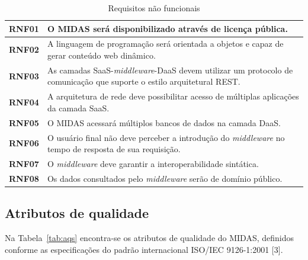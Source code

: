 \documentclass[11pt,a4paper]{article}
\begin{document}
\begin{table}[htb]
\centering
\caption{Requisitos não funcionais} \label{tab:rnf}
\begin{tabular*}{\linewidth}{@{\extracolsep{\fill}}|r p{13cm}|} \hline
\textbf{RNF01} & O MIDAS será disponibilizado através de licença pública. \\ \hline
\textbf{RNF02} & A linguagem de programação será orientada a objetos e capaz de gerar conteúdo web dinâmico.\\ \hline
\textbf{RNF03} &As camadas SaaS-\textit{middleware}-DaaS devem utilizar um protocolo de comunicação que suporte o estilo arquitetural REST. \\ \hline
 \textbf{RNF04} & A arquitetura de rede deve possibilitar acesso de múltiplas aplicações da camada SaaS.  \\ \hline
 \textbf{RNF05} & O MIDAS acessará múltiplos bancos de dados na camada DaaS.  \\ \hline
      \textbf{RNF06} & O usuário final não deve perceber a introdução do \textit{middleware} no tempo de resposta de sua requisição.  \\ \hline
  \textbf{RNF07} &     O \textit{middleware} deve garantir a interoperabilidade sintática.\\ \hline   
  \textbf{RNF08} &     Os dados consultados pelo \textit{middleware} serão de domínio público.\\ \hline       


\end{tabular*}
\end{table}

\subsection{Atributos de qualidade}
\label{subsec:aq}
Na Tabela~\ref{tab:aqs} encontra-se os atributos de qualidade do MIDAS, definidos conforme as especificações do padrão internacional ISO/IEC 9126-1:2001 [3].
\end{document}
